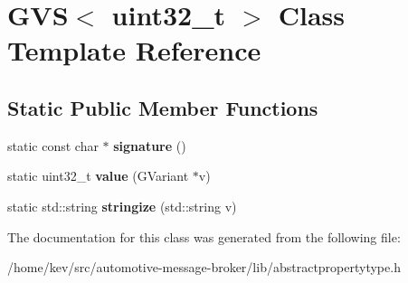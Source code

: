 \hypertarget{classGVS_3_01uint32__t_01_4}{\section{G\+V\+S$<$ uint32\+\_\+t $>$ Class Template Reference}
\label{classGVS_3_01uint32__t_01_4}
}
\subsection*{Static Public Member Functions}
\begin{DoxyCompactItemize}
\item 
\hypertarget{classGVS_3_01uint32__t_01_4_a4ead38a9a6e109e3f8cce37507cdbed5}{static const char $\ast$ {\bfseries signature} ()}\label{classGVS_3_01uint32__t_01_4_a4ead38a9a6e109e3f8cce37507cdbed5}

\item 
\hypertarget{classGVS_3_01uint32__t_01_4_aa71849881fbf20dcca20922bea646007}{static uint32\+\_\+t {\bfseries value} (G\+Variant $\ast$v)}\label{classGVS_3_01uint32__t_01_4_aa71849881fbf20dcca20922bea646007}

\item 
\hypertarget{classGVS_3_01uint32__t_01_4_ac8a872590d86a403b8441b4d0bb03a61}{static std\+::string {\bfseries stringize} (std\+::string v)}\label{classGVS_3_01uint32__t_01_4_ac8a872590d86a403b8441b4d0bb03a61}

\end{DoxyCompactItemize}


The documentation for this class was generated from the following file\+:\begin{DoxyCompactItemize}
\item 
/home/kev/src/automotive-\/message-\/broker/lib/abstractpropertytype.\+h\end{DoxyCompactItemize}
